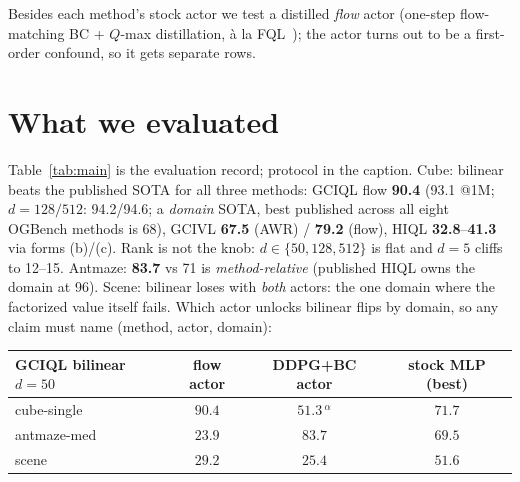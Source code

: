 \documentclass[11pt]{article}
\newcommand{\B}[1]{\textbf{#1}}
\newcommand{\loc}[1]{\textcolor{locgreen}{#1}}
\newcommand{\pub}[1]{\textcolor{puborange}{#1}}
\newcommand{\win}[1]{\B{\loc{#1}}}   %
\begin{document}
Besides each method's stock actor we test a distilled \emph{flow} actor
(one-step flow-matching BC + $Q$-max distillation, \`a la
FQL~\cite{park2025fql}); the actor turns out to be a first-order confound, so it
gets separate rows.

\section{What we evaluated}
\label{sec:results}
Table~\ref{tab:main} is the evaluation record; protocol in the caption. Cube:
bilinear beats the published SOTA for all three methods: GCIQL flow
\win{90.4} (\loc{93.1} @1M; $d{=}128/512$: 94.2/94.6; a \emph{domain} SOTA,
best published across all eight OGBench methods is \pub{68}), GCIVL \win{67.5}
(AWR) / \win{79.2} (flow), HIQL \win{32.8}--\win{41.3} via forms
(b)/(c). Rank is not the knob: $d\in\{50,128,512\}$ is flat and $d{=}5$
cliffs to 12--15. Antmaze: \win{83.7} vs \pub{71} is \emph{method-relative}
(published HIQL owns the domain at \pub{96}). Scene: bilinear loses with
\emph{both} actors: the one domain where the factorized value itself fails.
Which actor unlocks bilinear flips by domain, so any claim must name
(method, actor, domain):
\begin{center}\small
\begin{tabular}{@{}l ccc@{}}
\toprule
GCIQL bilinear $d{=}50$ & flow actor & DDPG+BC actor & stock MLP (best) \\
\midrule
cube-single  & \win{$90.4$} & \loc{$51.3$}\,$^{\alpha}$ & \loc{$71.7$} \\
antmaze-med  & \loc{$23.9$} & \win{$83.7$} & \loc{$69.5$} \\
scene        & \loc{$29.2$} & \loc{$25.4$} & \loc{$51.6$} \\
\bottomrule
\end{tabular}
\end{center}
\end{document}

